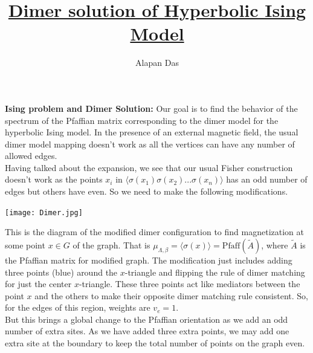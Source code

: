 \documentclass{article}
\title{\underline {\textbf{Dimer solution of Hyperbolic Ising Model}}}
\author{Alapan Das}
\date{}%
\begin{document}
	
	\textbf{Ising problem and Dimer Solution:} Our goal is to find the behavior of the spectrum of the Pfaffian matrix corresponding to the dimer model for the hyperbolic Ising model. In the presence of an external magnetic field, the usual dimer model mapping doesn't work as all the vertices can have any number of allowed edges. \\
	
	Having talked about the expansion, we see that our usual Fisher construction doesn't work as the points $x_i$ in $\langle{\sigma(x_1)\sigma(x_2)...\sigma(x_n)}\rangle$ has an odd number of edges but others have even. So we need to make the following modifications.\\
	
	
	\begin{center}
		\texttt{[image: Dimer.jpg]}\\
	\end{center}
	
	\vspace{0.5 cm}
	\pagebreak
	
	This is the diagram of the modified dimer configuration to find magnetization at some point $x\in G$ of the graph. That is $\mu_{\Lambda, \beta}=\langle {\sigma(x)} \rangle =\text{Pfaff}(\tilde{A})$, where $\tilde{A}$ is the Pfaffian matrix for modified graph. The modification just includes adding three points (blue) around the $x$-triangle and flipping the rule of dimer matching for just the center $x$-triangle. These three points act like mediators between the point $x$ and the others to make their opposite dimer matching rule consistent. So, for the edges of this region, weights are $v_{e}=1$. \\
	
	
	But this brings a global change to the Pfaffian orientation as we add an odd number of extra sites. As we have added three extra points, we may add one extra site at the boundary to keep the total number of points on the graph even.\\ 
	
\end{document}
